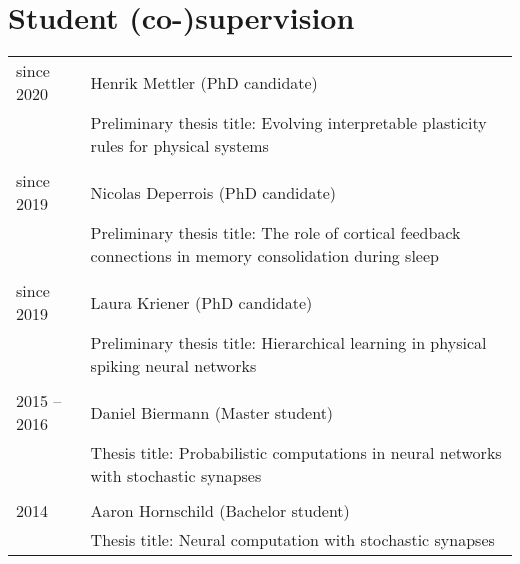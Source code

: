 \section{Student (co-)supervision}

\begin{longtable}{>{\hfill}p{3.3cm}|p{12.0cm}}
  since 2020 & Henrik Mettler (PhD candidate) \\
  & \footnotesize  Preliminary thesis title: Evolving interpretable plasticity rules for physical systems \\
  \multicolumn{2}{c}{} \\
  since 2019 & Nicolas Deperrois (PhD candidate) \\
  & \footnotesize  Preliminary thesis title: The role of cortical feedback connections in memory consolidation during sleep \\
  \multicolumn{2}{c}{} \\
  since 2019 & Laura Kriener (PhD candidate) \\
  & \footnotesize  Preliminary thesis title: Hierarchical learning in physical spiking neural networks \\
  \multicolumn{2}{c}{} \\
  2015 -- 2016 & Daniel Biermann (Master student) \\
  & \footnotesize  Thesis title: Probabilistic computations in neural networks with stochastic synapses \\
  \multicolumn{2}{c}{} \\
  2014 & Aaron Hornschild (Bachelor student) \\
  & \footnotesize Thesis title: Neural computation with stochastic synapses \\
\end{longtable}